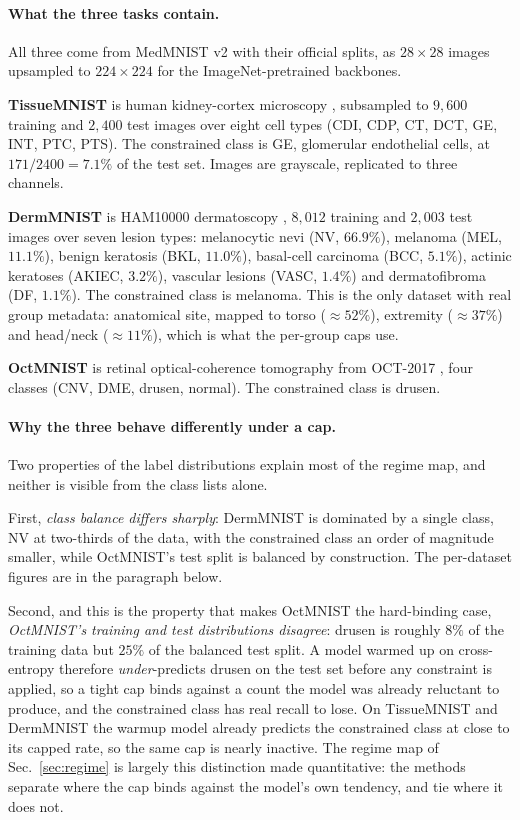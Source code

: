 \documentclass[10pt]{article}
\begin{document}
{\color{blue}
\paragraph{What the three tasks contain.}
All three come from MedMNIST v2 \citep{yang2023medmnist} with their official
splits, as $28{\times}28$ images upsampled to $224{\times}224$ for the
ImageNet-pretrained backbones.

\textbf{TissueMNIST} is human kidney-cortex microscopy
\citep{woloshuk2021situ}, subsampled to $9{,}600$ training and $2{,}400$ test
images over eight cell types (CDI, CDP, CT, DCT, GE, INT, PTC, PTS). The
constrained class is GE, glomerular endothelial cells, at $171/2400 = 7.1\%$ of
the test set. Images are grayscale, replicated to three channels.

\textbf{DermMNIST} is HAM10000 dermatoscopy \citep{tschandl2018ham10000},
$8{,}012$ training and $2{,}003$ test images over seven lesion types: melanocytic
nevi (NV, $66.9\%$), melanoma (MEL, $11.1\%$), benign keratosis (BKL, $11.0\%$),
basal-cell carcinoma (BCC, $5.1\%$), actinic keratoses (AKIEC, $3.2\%$),
vascular lesions (VASC, $1.4\%$) and dermatofibroma (DF, $1.1\%$). The
constrained class is melanoma. This is the only dataset with real group
metadata: anatomical site, mapped to torso ($\approx52\%$), extremity
($\approx37\%$) and head/neck ($\approx11\%$), which is what the per-group caps
use.

\textbf{OctMNIST} is retinal optical-coherence tomography from OCT-2017
\citep{kermany2018identifying}, four classes (CNV, DME, drusen, normal). The
constrained class is drusen.

\paragraph{Why the three behave differently under a cap.}
Two properties of the label distributions explain most of the regime map, and
neither is visible from the class lists alone.

First, \emph{class balance differs sharply}: DermMNIST is dominated by a single
class, NV at two-thirds of the data, with the constrained class an order of
magnitude smaller, while OctMNIST's test split is balanced by construction. The
per-dataset figures are in the paragraph below.

Second, and this is the property that makes OctMNIST the hard-binding case,
\emph{OctMNIST's training and test distributions disagree}: drusen is roughly
$8\%$ of the training data but $25\%$ of the balanced test split. A model warmed
up on cross-entropy therefore \emph{under}-predicts drusen on the test set
before any constraint is applied, so a tight cap binds against a count the model
was already reluctant to produce, and the constrained class has real recall to
lose. On TissueMNIST and DermMNIST the warmup model already predicts the
constrained class at close to its capped rate, so the same cap is nearly
inactive. The regime map of Sec.~\ref{sec:regime} is largely this distinction
made quantitative: the methods separate where the cap binds against the model's
own tendency, and tie where it does not.

}
\end{document}

